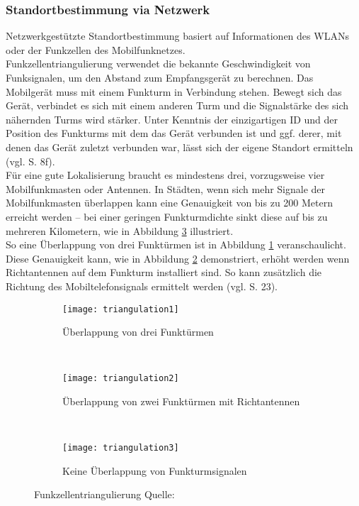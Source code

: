 \subsubsection{Standortbestimmung via Netzwerk}
Netzwerkgestützte Standortbestimmung basiert auf Informationen des \glspl{WLAN} oder der Funkzellen des Mobilfunknetzes.\\ 
Funkzellentriangulierung verwendet die bekannte Geschwindigkeit von Funksignalen, um den Abstand zum Empfangsgerät zu berechnen. Das Mobilgerät muss mit einem Funkturm in Verbindung stehen. Bewegt sich das Gerät, verbindet es sich mit einem anderen Turm und die Signalstärke des sich nähernden Turms wird stärker. Unter Kenntnis der einzigartigen ID und der Position des Funkturms mit dem das Gerät verbunden ist und ggf. derer, mit denen das Gerät zuletzt verbunden war, lässt sich der eigene Standort ermitteln (vgl. \cite{location} S. 8f). \\
Für eine gute Lokalisierung braucht es mindestens drei, vorzugsweise vier Mobilfunkmasten oder Antennen. In Städten, wenn sich mehr Signale der Mobilfunkmasten überlappen kann eine Genauigkeit von bis zu 200 Metern erreicht werden -- bei einer geringen Funkturmdichte sinkt diese auf bis zu mehreren Kilometern, wie in Abbildung \ref{fig:cell3} illustriert. \\
So eine Überlappung von drei Funktürmen ist in Abbildung \ref{fig:cell1} veranschaulicht. Diese Genauigkeit kann, wie in Abbildung \ref{fig:cell2} demonstriert, erhöht werden wenn Richtantennen auf dem Funkturm installiert sind. So kann zusätzlich die Richtung des Mobiltelefonsignals ermittelt werden (vgl. \cite{gps} S. 23). \\
\begin{figure}[H]
        \centering
        \begin{subfigure}[t]{0.23\textwidth}
                \texttt{[image: triangulation1]}
                \caption{Überlappung von drei Funktürmen}
                \label{fig:cell1}
        \end{subfigure}
        ~ 
        \begin{subfigure}[t]{0.23\textwidth}
                \texttt{[image: triangulation2]}
                \caption{Überlappung von zwei Funktürmen mit Richtantennen}
                \label{fig:cell2}
        \end{subfigure}
         ~ 
        \begin{subfigure}[t]{0.23\textwidth}
                \texttt{[image: triangulation3]}
                \caption{Keine Überlappung von Funkturmsignalen}
                \label{fig:cell3}
        \end{subfigure}
        \grayRule
        \caption[Funkzellentriangulierung]{Funkzellentriangulierung Quelle: \cite{fig:cell}}
        \label{fig:cell}
\end{figure}
